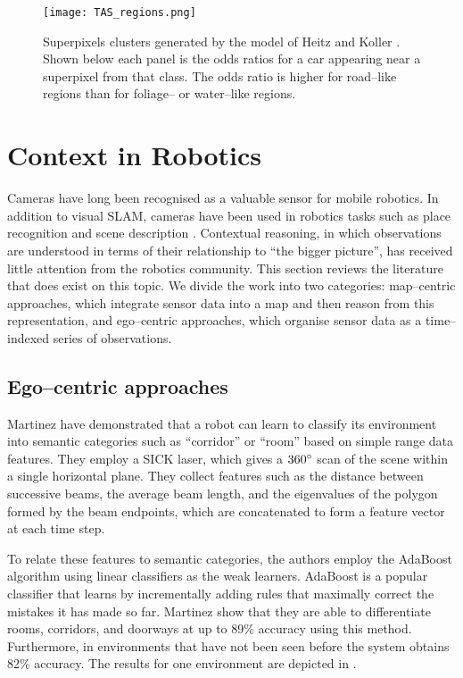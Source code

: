 \begin{figure}[tb]
  \centering
  \texttt{[image: TAS\_regions.png]}
  \caption{Superpixels clusters generated by the model of Heitz and
    Koller \cite{Heitz08}. Shown below each panel is the odds ratios for
    a car appearing near a superpixel from that class. The odds ratio is
    higher for road--like regions than for foliage-- or water--like
    regions.}
  \label{fig:TAS-regions}
\end{figure}

\section{Context in Robotics}
Cameras have long been recognised as a valuable sensor for mobile
robotics. In addition to visual SLAM, cameras have been used in
robotics tasks such as place recognition \cite{Cummins08} and scene
description \cite{Posner08}. Contextual reasoning, in which
observations are understood in terms of their relationship to ``the
bigger picture'', has received little attention from the robotics
community. This section reviews the literature that does exist on this
topic. We divide the work into two categories: map--centric
approaches, which integrate sensor data into a map and then reason
from this representation, and ego--centric approaches, which organise
sensor data as a time--indexed series of observations.

\subsection{Ego--centric approaches}
Martinez \etal \cite{Mozos05} have demonstrated that a robot can learn
to classify its environment into semantic categories such as
``corridor'' or ``room'' based on simple range data features. They
employ a SICK laser, which gives a $360\degrees$ scan of the scene
within a single horizontal plane. They collect features such as the
distance between successive beams, the average beam length, and the
eigenvalues of the polygon formed by the beam endpoints, which are
concatenated to form a feature vector at each time step.

To relate these features to semantic categories, the authors employ
the AdaBoost algorithm \cite{Schapire98} using linear classifiers as
the weak learners. AdaBoost is a popular classifier that learns by
incrementally adding rules that maximally correct the mistakes it has
made so far. Martinez \etal show that they are able to differentiate
rooms, corridors, and doorways at up to 89\% accuracy using this
method. Furthermore, in environments that have not been seen before
the system obtains 82\% accuracy. The results for one environment are
depicted in .\\

